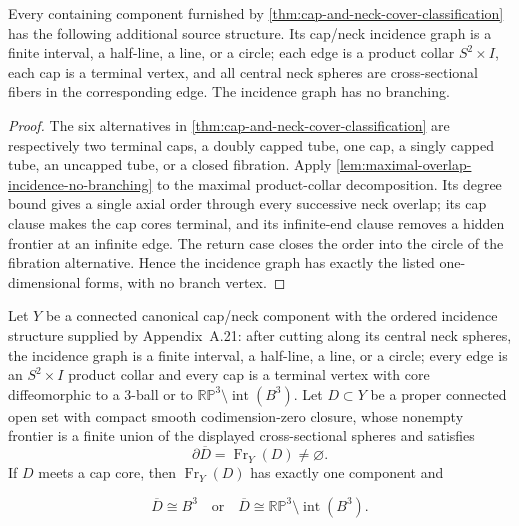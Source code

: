 \begin{lemma}
\label{lem:canonical-cover-incidence-structure}
\notready
Every containing component furnished by
\ref{thm:cap-and-neck-cover-classification} has the following additional
source structure.  Its cap/neck incidence graph is a finite interval, a
half-line, a line, or a circle; each edge is a product collar
$S^2\times I$, each cap is a terminal vertex, and all central neck spheres
are cross-sectional fibers in the corresponding edge.  The incidence graph
has no branching.
\end{lemma}

\begin{proof}
The six alternatives in
\ref{thm:cap-and-neck-cover-classification} are respectively two terminal
caps, a doubly capped tube, one cap, a singly capped tube, an uncapped tube,
or a closed fibration.  Apply
\ref{lem:maximal-overlap-incidence-no-branching} to the maximal product-collar
decomposition.  Its degree bound gives a single axial order through every
successive neck overlap; its cap clause makes the cap cores terminal, and its
infinite-end clause removes a hidden frontier at an infinite edge.  The return
case closes the order into the circle of the fibration alternative.  Hence the
incidence graph has exactly the listed one-dimensional forms, with no branch
vertex.
\end{proof}

\begin{lemma}
\label{lem:ordered-relative-capped-cover}
\notready
Let $Y$ be a connected canonical cap/neck component with the ordered
incidence structure supplied by Appendix~A.21: after cutting along its central
neck spheres, the incidence graph is a finite interval, a half-line, a line,
or a circle; every edge is an $S^2\times I$ product collar and every cap is a
terminal vertex with core diffeomorphic to a $3$-ball or to
$\mathbb{RP}^3\setminus\operatorname{int}(B^3)$.  Let $D\subset Y$ be a
proper connected open set with compact smooth codimension-zero closure, whose
nonempty frontier is a finite union of the displayed cross-sectional spheres
and satisfies
\[
 \partial\overline D=\operatorname{Fr}_Y(D)\ne\varnothing.
\]
If $D$ meets a cap core, then $\operatorname{Fr}_Y(D)$ has exactly one
component and

\[
 \overline D\cong B^3
 \quad\text{or}\quad
 \overline D\cong\mathbb{RP}^3\setminus\operatorname{int}(B^3).
\]
\end{lemma}


